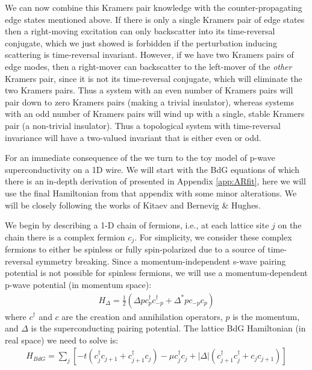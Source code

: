 We can now combine this Kramers pair knowledge with the counter-propagating edge states mentioned above. If there is only a single Kramers pair of edge states then a right-moving excitation can only backscatter into its time-reversal conjugate, which we just showed is forbidden if the perturbation inducing scattering is time-reversal invariant. However, if we have two Kramers pairs of edge modes, then a right-mover can backscatter to the left-mover of the \textit{other} Kramers pair, since it is not its time-reversal conjugate, which will eliminate the two Kramers pairs. Thus a system with an even number of Kramers pairs will pair down to zero Kramers pairs (making a trivial insulator), whereas systems with an odd number of Kramers pairs will wind up with a single, stable Kramers pair (a non-trivial insulator)\cite{Hasan2010}. Thus a topological system with time-reversal invariance will have a two-valued invariant that is either even or odd.\par
For an immediate consequence of the we turn to the toy model of p-wave superconductivity on a 1D wire. We will start with the \ac{BdG} equations of which there is an in-depth derivation of presented in Appendix \ref{app:ARfit}, here we will use the final Hamiltonian from that appendix with some minor alterations. We will be closely following the works of Kitaev and Bernevig \& Hughes\cite{Kitaev2001, bernevig_hughes_2013}.\par 
We begin by describing a 1-D chain of fermions, i.e., at each lattice site $j$ on the chain there is a complex fermion $c_{j}$. For simplicity, we consider these complex fermions to either be spinless or fully spin-polarized due to a source of time-reversal symmetry breaking. Since a momentum-independent s-wave pairing potential is not possible for spinless fermions, we will use a momentum-dependent p-wave potential (in momentum space):
\begin{align}
	H_{\Delta} = \frac{1}{2}\left(\Delta pc_{p}^{\dagger}c_{-p}^{\dagger}+\Delta^{*}pc_{-p}c_{p}\right)
\end{align}
where $c^{\dagger}$ and $c$ are the creation and annihilation operators, $p$ is the momentum, and $\Delta$ is the superconducting pairing potential. The lattice \ac{BdG} Hamiltonian (in real space) we need to solve is:
\begin{align}
	H_{BdG} = \sum_{j}\left[-t\left(c_{j}^{\dagger}c_{j+1}+c_{j+1}^{\dagger}c_{j}\right)-\mu c_{j}^{\dagger}c_{j}+|\Delta|\left(c_{j+1}^{\dagger}c_{j}^{\dagger}+c_{j}c_{j+1}\right)\right]
\end{align}
